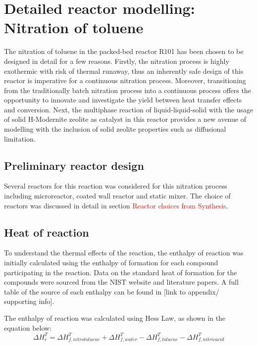 \section{Detailed reactor modelling: Nitration of toluene}
The nitration of toluene in the packed-bed reactor R101 has been chosen to be designed in detail for a few reasons. Firstly, the nitration process is highly exothermic with risk of thermal runaway, thus an inherently safe design of this reactor is imperative for a continuous nitration process. Moreover, transitioning from the traditionally batch nitration process into a continuous process offers the opportunity to innovate and investigate the yield between heat transfer effects and conversion. Next, the multiphase reaction of liquid-liquid-solid with the usage of solid H-Modernite zeolite as catalyst in this reactor provides a new avenue of modelling with the inclusion of solid zeolite properties such as diffusional limitation. 

\subsection{Preliminary reactor design}
Several reactors for this reaction was considered for this nitration process including microreactor, coated wall reactor and static mixer. The choice of reactors was discussed in detail in section \textcolor{red}{Reactor choices from Synthesis}.

\subsection{Heat of reaction}
To understand the thermal effects of the reaction, the enthalpy of reaction was initially calculated using the enthalpy of formation for each compound participating in the reaction. Data on the standard heat of formation for the compounds were sourced from the NIST website and literature papers. A full table of the source of each enthalpy can be found in [link to appendix/ supporting info]. 

The enthalpy of reaction was calculated using Hess Law, as shown in the equation below:
\begin{equation}
  \Delta H_{r}^{T} = \Delta H_{f,nitrotoluene}^{T} + \Delta H_{f,water}^{T} - \Delta H_{f,toluene}^{T} - \Delta H_{f,nitric acid}^{T}
\end{equation}

